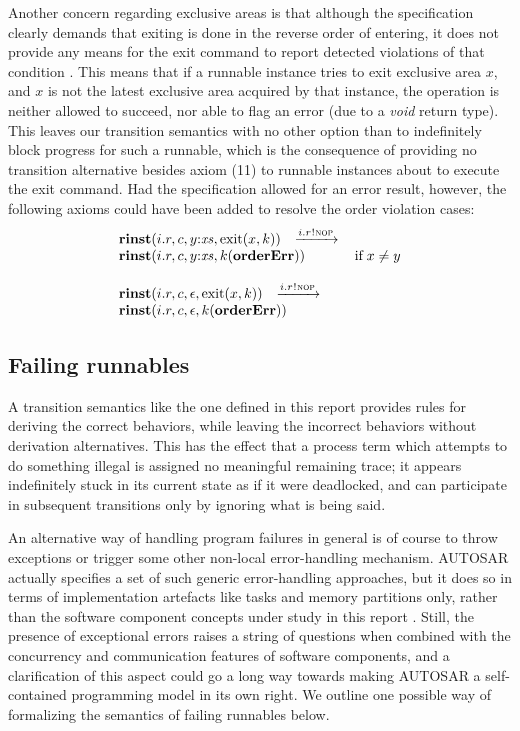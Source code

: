 \documentclass[10pt,conference]{IEEEtran}
\begin{document}
Another concern regarding exclusive areas is that although the specification clearly demands that exiting is done in the reverse order of entering, it does not provide any means for the exit command to report detected violations of that condition \cite[ch.~5.6.29]{AR:RTE}. This means that if a runnable instance tries to exit exclusive area $x$, and $x$ is not the latest exclusive area acquired by that instance, the operation is neither allowed to succeed, nor able to flag an error (due to a \emph{void} return type). This leaves our transition semantics with no other option than to indefinitely block progress for such a runnable, which is the consequence of providing no transition alternative besides axiom (11) to runnable instances about to execute the exit command. Had the specification allowed for an error result, however, the following axioms could have been added to resolve the order violation cases:
$$
\begin{array}{lcll}
		{\Trinst {i.r} c {\Tcons y \Xs} {\TrteExit x k}}
		\;\; \red{\Tsay {i.r} \Tnop} \\
		{\Trinst {i.r} c {\Tcons y \Xs} {\Tap k {\kw{orderErr}}}}
		& \Pif\;x \neq y
\\ \\
		{\Trinst {i.r} c \Teps {\TrteExit x k}}
		\;\; \red{\Tsay {i.r} \Tnop} \\
		{\Trinst {i.r} c \Teps {\Tap k {\kw{orderErr}}}}

\end{array}
$$


\subsection{Failing runnables}

A transition semantics like the one defined in this report provides rules for deriving the correct behaviors, while leaving the incorrect behaviors without derivation alternatives. This has the effect that a process term which attempts to do something illegal is assigned no meaningful remaining trace; it appears indefinitely stuck in its current state as if it were deadlocked, and can participate in subsequent transitions only by ignoring what is being said.

An alternative way of handling program failures in general is of course to throw exceptions or trigger some other non-local error-handling mechanism. AUTOSAR actually specifies a set of such generic error-handling approaches, but it does so in terms of implementation artefacts like tasks and memory partitions only, rather than the software component concepts under study in this report \cite{AR:ERR}. Still, the presence of exceptional errors raises a string of questions when combined with the concurrency and communication features of software components, and a clarification of this aspect could go a long way towards making AUTOSAR a self-contained programming model in its own right. We outline one possible way of formalizing the semantics of failing runnables below.
\end{document}
